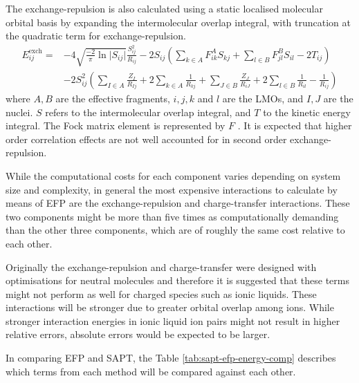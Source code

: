 The exchange-repulsion is also calculated using a static localised molecular orbital basis by expanding the intermolecular overlap integral, with truncation at the quadratic term for exchange-repulsion.
\begin{equation}
   \begin{split}
    E^{\text{exch}}_{ij} = & -4 \sqrt{\frac{-2}{\pi} \ln \lvert S_{ij} \rvert } \frac{S^2_{ij}}{R_{ij}} 
                             -2 S_{ij} \left( \sum_{k \in A} F^A_{ik} S_{kj} + \sum_{l \in B} F^B_{jl}S_{il} - 2 T_{ij} \right) \\
                             &  -2 S^2_{ij} \left( \sum_{I \in A} \frac{Z_I}{R_{Ij}}  + 2 \sum_{k \in A} \frac{1}{R_{kj}} + 
                                 \sum_{J \in B} \frac{Z_J}{R_{iJ}} + 2 \sum_{l \in B} \frac{1}{R_{il}} - \frac{1}{R_{ij}} \right)
   \end{split}
\end{equation}
where $A,B$ are the effective fragments, $i, j, k$ and $l$ are the LMOs, and $I, J$ are the nuclei. 
$S$ refers to the intermolecular overlap integral, and $T$ to the kinetic energy integral.
The Fock matrix element is represented by $F$
\cite{Ghosh2010a}.
It is expected that higher order correlation effects are not well accounted for in second order exchange-repulsion.

While the computational costs for each component varies depending on system size and complexity, in general the most expensive interactions to calculate by means of EFP are the exchange-repulsion and charge-transfer interactions.
These two components might be more than five times as computationally demanding than the other three components, which are of roughly the same cost relative to each other.


Originally the exchange-repulsion and charge-transfer were designed with optimisations for neutral molecules and therefore it is suggested that these terms might not perform as well for charged species such as ionic liquids.
These interactions will be stronger due to greater orbital overlap among ions.
While stronger interaction energies in ionic liquid ion pairs might not result in higher relative errors, absolute errors would be expected to be larger.


In comparing EFP and SAPT, the Table \ref{tab:sapt-efp-energy-comp} describes which terms from each method will be compared against each other.

